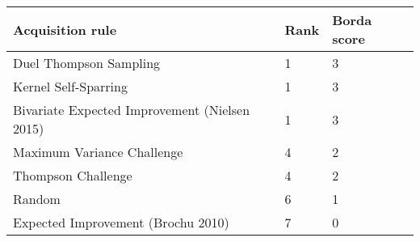 \begin{tabular}{lll}
Acquisition rule & Rank & Borda score \\ 
\hline 
Duel Thompson Sampling & 1 & 3 \\ 
Kernel Self-Sparring & 1 & 3 \\ 
Bivariate Expected Improvement (Nielsen 2015) & 1 & 3 \\ 
Maximum Variance Challenge & 4 & 2 \\ 
Thompson Challenge & 4 & 2 \\ 
Random & 6 & 1 \\ 
Expected Improvement (Brochu 2010) & 7 & 0 \\ 
\hline 
\end{tabular}